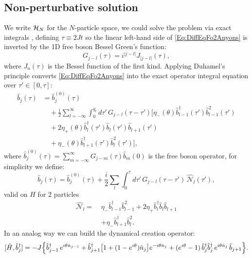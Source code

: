 \documentclass[a4paper, amsfonts, amssymb, amsmath, reprint, showkeys, nofootinbib ,twoside]{revtex4-2}
\begin{document}
\subsection{Non-perturbative solution} 
We write $\mathcal H_{N}$ for the $N$-particle space, we could solve the problem via exact integrals , defining $\tau \equiv 2Jt$ so the linear left-hand side of \eqref{Eq:DiffEqFo2Anyons} is inverted by the 1D free boson Bessel Green's function: 
\begin{equation} 
G_{j-l}(\tau) = i^{\vert{}j-l\vert{}} J_{\vert{}j-l\vert{}}(\tau), 
\end{equation}
where $J_n(\tau)$ is the Bessel function of the first kind. Applying Duhamel's principle converts \eqref{Eq:DiffEqFo2Anyons} into the exact operator integral equation over $\tau' \in [0, \tau]$: 
\begin{equation}
\begin{split}
\hat{b}_j(\tau) &= \hat{b}_j^{(0)}(\tau) \\
&\quad + \frac{i}{2} \sum_{l=-\infty}^\infty \int_0^{q_t} d\tau' \, G_{j-l}(\tau-\tau') \Big[ \eta_-(\theta)\hat{b}_{l-1}^\dagger(\tau')\hat{b}_{l-1}^2(\tau') \\
&\quad + 2\eta_+(\theta)\hat{b}_l^\dagger(\tau')\hat{b}_l(\tau')\hat{b}_{l+1}(\tau') \\
&\quad  + \eta_-(\theta)\hat{b}_{l+1}^\dagger(\tau')\hat{b}_l^2(\tau') \Big],
\end{split}
\end{equation}
where $\hat{b}_j^{(0)}(\tau) = \sum_{m=-\infty}^\infty G_{j-m}(\tau)\hat{b}_m(0)$ is the  free boson operator, for simplicity we define:
\begin{equation}\label{eq:duhamel}
\hat b_j(\tau)=\hat b_j^{(0)}(\tau)+\frac{i}{2}\sum_l\int_0^\tau\! d\tau'\,G_{j-l}(\tau-\tau')\,\hat{\mathcal N}_l(\tau'),
\end{equation}
valid on $H$ for $2$ particles
\begin{equation}\label{eq:Nl}
\begin{split}
\hat{\mathcal N}_l=\;&\eta_-\hat b_{l-1}^\dagger\hat b_{l-1}^2+2\eta_+\hat b_l^\dagger\hat b_l\hat b_{l+1}\\
&+\eta_-\hat b_{l+1}^\dagger\hat b_l^2 .
\end{split}
\end{equation}
In an analog way we can build the dynamical creation operator: 
\begin{equation}\label{eq:commgen}
[\hat H,\hat b^\dagger_{j}]=-J\Big\{\hat b^\dagger_{j-1}\,e^{i\theta\hat n_{j-1}}+\hat b^\dagger_{j+1}\big[1+(1-e^{i\theta})\hat n_{j}\big]e^{-i\theta\hat n_{j}}+(e^{i\theta}-1)\,\hat b^\dagger_{j}\hat b^\dagger_{j}\,e^{i\theta\hat n_{j}}\,\hat b_{j+1}\Big\}.
\end{equation}
\end{document}
